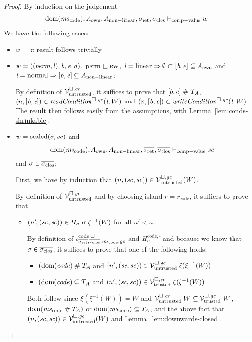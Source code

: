 \documentclass[a4paper]{article}
\begin{document}
\begin{proof}
  By induction on the judgement 
  \begin{equation*}
    \dom(\mscode), A_{\mathrm{own}}, A_{\mathrm{non-linear}}, \sigrets,\sigcloss \vdash_{\mathrm{comp-value}} w
  \end{equation*}
  We have the following cases:
  \begin{itemize}
  \item $w = z$: result follows trivially
  \item $w = ((\perm,\lin),\baddr,\eaddr,\aaddr)$,
    $\permbnf \sqsubseteq \rw$,
    $\lin = \linear \Rightarrow \emptyset \subset [\baddr,\eaddr] \subseteq A_{\mathrm{own}}$ and
    $\lin = \normal \Rightarrow [\baddr,\eaddr] \subseteq A_{\mathrm{non-linear}}$:
    
    By definition of $\lrv$, it suffices to prove that $[b,e] \mathrel{\#} \ta$, $\npair{[\baddr,\eaddr]} \in \readCond{\lin,W}$ and $\npair{[\baddr,\eaddr]}\in\writeCond{\lin,W}$.
    The result then follows easily from the assumptions, with Lemma~\ref{lem:conds-shrinkable}.
    
  \item $w = \sealed{\sigma,\vsc}$ and
    \begin{equation*}
      \dom(\mscode),A_{\mathrm{own}},A_{\mathrm{non-linear}},\sigrets,\sigcloss \vdash_{\mathrm{comp-value}} \vsc
    \end{equation*}
    and $\sigma \in \sigcloss$:

    First, we have by induction that $\npair{(\vsc,\vsc)} \in \lrv (W)$.

    By definition of $\lrv$ and by choosing island $r = r_{\mathrm{code}}$, it suffices to prove that
    \begin{itemize}
    \item $\npair[n']{(\vsc,\vsc)} \in H_\sigma \; \sigma \; \xi^{-1}(W)$ for all $n' < n$:

     By definition of $\codereg{\sigrets,\sigcloss,\mscode,\gc}$ and $H^\mathrm{code,\square}_\sigma$ and because we know that $\sigma\in\sigcloss$, it suffices to prove that
     one of the following holds: 
     \begin{itemize}
     \item $(\dom(\code) \mathrel{\#} \ta$ and $\npair[n']{(\vsc,\vsc)} \in \lrv \; \xi(\xi^{-1}(W))$
     \item $(\dom(\code) \subseteq \ta$ and $\npair[n']{(\vsc,\vsc)} \in \lrvtrusted \; \xi(\xi^{-1}(W))$
     \end{itemize}
     Both follow since $\xi(\xi^{-1}(W)) = W$ and $\lrv \; W \subseteq \lrvtrusted \; W$, $\dom(\mscode \mathrel{\#} \ta)$ or $\dom(\mscode) \subseteq \ta$, and the above fact that $\npair{(\vsc,\vsc)} \in \lrv (W)$ and Lemma~\ref{lem:downwards-closed}.


\end{itemize}
\end{itemize}
\end{proof}
\end{document}

